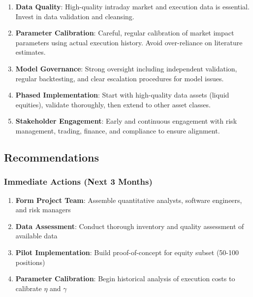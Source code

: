\documentclass[11pt,a4paper]{article}
\begin{document}
\begin{enumerate}
    \item \textbf{Data Quality}: High-quality intraday market and execution data is essential. Invest in data validation and cleansing.

    \item \textbf{Parameter Calibration}: Careful, regular calibration of market impact parameters using actual execution history. Avoid over-reliance on literature estimates.

    \item \textbf{Model Governance}: Strong oversight including independent validation, regular backtesting, and clear escalation procedures for model issues.

    \item \textbf{Phased Implementation}: Start with high-quality data assets (liquid equities), validate thoroughly, then extend to other asset classes.

    \item \textbf{Stakeholder Engagement}: Early and continuous engagement with risk management, trading, finance, and compliance to ensure alignment.
\end{enumerate}

\subsection{Recommendations}

\subsubsection{Immediate Actions (Next 3 Months)}

\begin{enumerate}
    \item \textbf{Form Project Team}: Assemble quantitative analysts, software engineers, and risk managers

    \item \textbf{Data Assessment}: Conduct thorough inventory and quality assessment of available data

    \item \textbf{Pilot Implementation}: Build proof-of-concept for equity subset (50-100 positions)

    \item \textbf{Parameter Calibration}: Begin historical analysis of execution costs to calibrate $\eta$ and $\gamma$
\end{enumerate}
\end{document}

